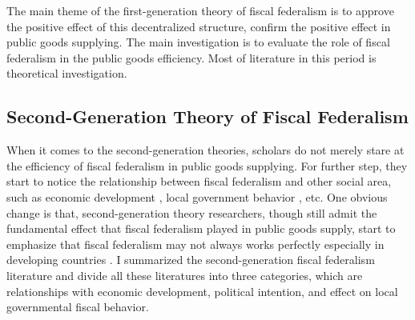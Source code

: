 The main theme of the first-generation theory of fiscal federalism is to approve the positive effect of this decentralized structure, confirm the positive effect in public goods supplying. The main investigation is to evaluate the role of fiscal federalism in the public goods efficiency. Most of literature in this period is theoretical investigation.

\subsection{Second-Generation Theory of Fiscal Federalism}
When it comes to the second-generation theories, scholars do not merely stare at the efficiency of fiscal federalism in public goods supplying. For further step, they start to notice the relationship between fiscal federalism and other social area, such as economic development \cite{cai2005does,barro1991economic}, local government behavior \cite{jin2005regional}, etc. One obvious change is that, second-generation theory researchers, though still admit the fundamental effect that fiscal federalism played in public goods supply, start to emphasize that fiscal federalism may not always works perfectly especially in developing countries \cite{keen1997fiscal,treisman2002decentralization,bardhan2002decentralization,bucovetsky2005public}. I summarized the second-generation fiscal federalism literature and divide all these literatures into three categories, which are relationships with economic development, political intention, and effect on local governmental fiscal behavior.

